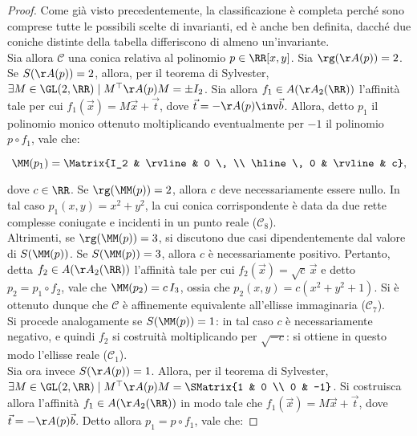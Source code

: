 \documentclass[11pt]{article}
\begin{document}
	\vskip 0.1in

	\begin{proof}
		Come già visto precedentemente, la classificazione è completa perché sono comprese tutte le possibili
		scelte di invarianti, ed è anche ben definita, dacché
		due coniche distinte della tabella differiscono di almeno un'invariante. \\
		
		Sia allora $\mathcal{C}$ una conica relativa al polinomio $p \in \RR[x, y]$. Sia $\rg(\AA(p)) = 2$.
		Se $S(\AA(p)) = 2$, allora, per il teorema di Sylvester, $\exists M \in \GL(2, \RR) \mid M^\top \AA(p) M = \pm I_2$. Sia allora
		$f_1 \in A(\AA_2(\RR))$ l'affinità tale per cui
		$f_1(\vec x) = M \vec x + \vec t$, dove $\vec t = - \AA(p)\inv \vec b$. Allora, detto $p_1$ il polinomio monico ottenuto moltiplicando eventualmente per $-1$ il polinomio $p \circ f_1$, vale che:
		
		\[ \MM(p_1) = \Matrix{I_2 & \rvline & 0 \, \\ \hline \, 0 & \rvline & c}, \]
		
		\vskip 0.05in
		
		dove $c \in \RR$. Se $\rg(\MM(p)) = 2$, allora
		$c$ deve necessariamente essere nullo. In tal caso
		$p_1(x, y) = x^2 + y^2$, la cui conica corrispondente
		è data da due rette complesse coniugate e incidenti in un punto reale ($\mathcal{C}_8$). \\
		
		Altrimenti, se
		$\rg(\MM(p)) = 3$, si discutono due casi dipendentemente dal valore di $S(\MM(p))$. Se
		$S(\MM(p)) = 3$, allora $c$ è necessariamente positivo. Pertanto, detta $f_2 \in A(\AA_2(\RR))$
		l'affinità tale per cui $f_2(\vec x) = \sqrt{c} \, \vec x$ e detto $p_2 = p_1 \circ f_2$, vale che $\MM(p_2) = c \, I_3$, ossia che $p_2(x, y) = c(x^2 + y^2 + 1)$. Si è ottenuto dunque che $\mathcal{C}$ è affinemente equivalente all'ellisse immaginaria ($\mathcal{C}_7$). \\
		
		Si procede analogamente se $S(\MM(p)) = 1$: in
		tal caso $c$ è necessariamente negativo, e quindi
		$f_2$ si costruità moltiplicando per $\sqrt{-c}$:
		si ottiene in questo modo l'ellisse reale ($\mathcal{C}_1$). \\
		
		Sia ora invece $S(\AA(p)) = 1$. Allora, per il teorema di Sylvester, $\exists M \in \GL(2, \RR) \mid M^\top \AA(p) M = \SMatrix{1 & 0 \\ 0 & -1}$.
		Si costruisca allora l'affinità $f_1 \in A(\AA_2(\RR))$ in modo tale che $f_1(\vec x) = M \vec x + \vec t$, dove $\vec t = -\AA(p) \vec b$.
		Detto allora $p_1 = p \circ f_1$, vale che:
		

\end{proof}
\end{document}
